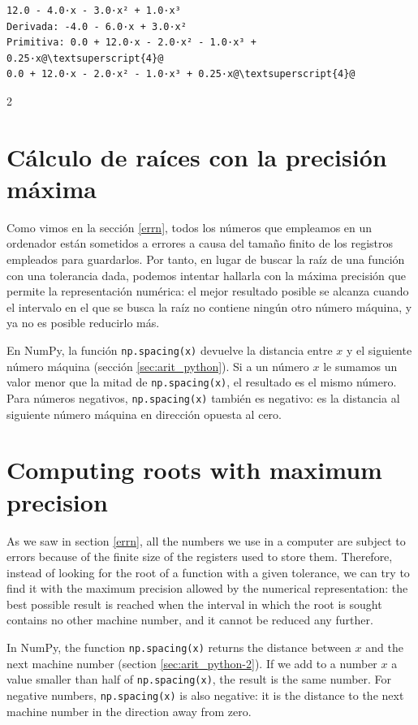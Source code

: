 \begin{verbatim}
12.0 - 4.0·x - 3.0·x² + 1.0·x³
Derivada: -4.0 - 6.0·x + 3.0·x²
Primitiva: 0.0 + 12.0·x - 2.0·x² - 1.0·x³ + 0.25·x@\textsuperscript{4}@
0.0 + 12.0·x - 2.0·x² - 1.0·x³ + 0.25·x@\textsuperscript{4}@
\end{verbatim}

\begin{paracol}{2}
\section{Cálculo de raíces con la precisión máxima}\label{sec:precmax}
Como vimos en la sección \ref{errn}, todos los números que empleamos en un ordenador están sometidos a errores a causa del tamaño finito de los registros empleados para guardarlos. Por tanto, en lugar de buscar la raíz de una función con una tolerancia dada, podemos intentar hallarla con la máxima precisión que permite la representación numérica: el mejor resultado posible se alcanza cuando el intervalo en el que se busca la raíz no contiene ningún otro número máquina, y ya no es posible reducirlo más.

En NumPy, la función \texttt{np.spacing(x)} devuelve la distancia entre $x$ y el siguiente número máquina (sección \ref{sec:arit_python}). Si a un número $x$ le sumamos un valor menor que la mitad de \texttt{np.spacing(x)}, el resultado es el mismo número. Para números negativos, \texttt{np.spacing(x)} también es negativo: es la distancia al siguiente número máquina en dirección opuesta al cero.

\switchcolumn
\section{Computing roots with maximum precision}\label{sec:precmax-2}
As we saw in section \ref{errn}, all the numbers we use in a computer are subject to errors because of the finite size of the registers used to store them. Therefore, instead of looking for the root of a function with a given tolerance, we can try to find it with the maximum precision allowed by the numerical representation: the best possible result is reached when the interval in which the root is sought contains no other machine number, and it cannot be reduced any further.

In NumPy, the function \texttt{np.spacing(x)} returns the distance between $x$ and the next machine number (section \ref{sec:arit_python-2}). If we add to a number $x$ a value smaller than half of \texttt{np.spacing(x)}, the result is the same number. For negative numbers, \texttt{np.spacing(x)} is also negative: it is the distance to the next machine number in the direction away from zero.

\end{paracol}


